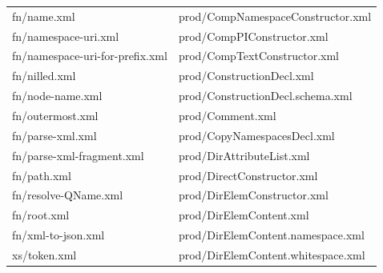 \begin{table}[]
\begin{tabular}{ll}
		fn/name.xml                                                                     & prod/CompNamespaceConstructor.xml                                                   \\
		fn/namespace-uri.xml                                                            & prod/CompPIConstructor.xml                                                          \\
		fn/namespace-uri-for-prefix.xml                                                 & prod/CompTextConstructor.xml                                                        \\
		fn/nilled.xml                                                                   & prod/ConstructionDecl.xml                                                           \\
		fn/node-name.xml                                                                & prod/ConstructionDecl.schema.xml                                                    \\
		fn/outermost.xml                                                                & prod/Comment.xml                                                                    \\
		fn/parse-xml.xml                                                                & prod/CopyNamespacesDecl.xml                                                         \\
		fn/parse-xml-fragment.xml                                                       & prod/DirAttributeList.xml                                                           \\
		fn/path.xml                                                                     & prod/DirectConstructor.xml                                                          \\
		fn/resolve-QName.xml                                                            & prod/DirElemConstructor.xml                                                         \\
		fn/root.xml                                                                     & prod/DirElemContent.xml                                                             \\
		fn/xml-to-json.xml                                                              & prod/DirElemContent.namespace.xml                                                   \\
		xs/token.xml                                                                    & prod/DirElemContent.whitespace.xml                                                  \\

\end{tabular}
\end{table}
